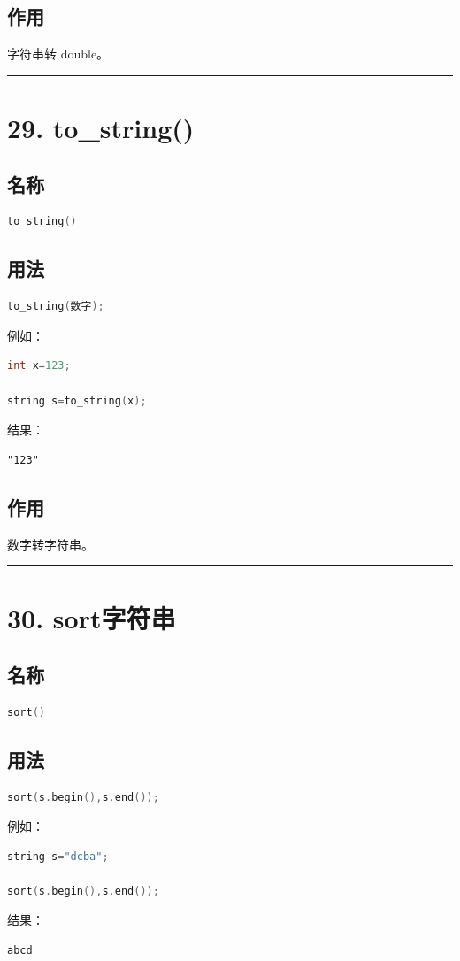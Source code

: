\documentclass[10pt,twocolumn]{extarticle}
\begin{document}
\subsection{作用}
字符串转 double。

\noindent\rule{\linewidth}{0.4pt}

\section{29. to\_string()}

\subsection{名称}
\begin{lstlisting}[language=C++]
to_string()
\end{lstlisting}

\subsection{用法}
\begin{lstlisting}[language=C++]
to_string(数字);
\end{lstlisting}
例如：
\begin{lstlisting}[language=C++]
int x=123;

string s=to_string(x);
\end{lstlisting}
结果：
\begin{lstlisting}
"123"
\end{lstlisting}

\subsection{作用}
数字转字符串。

\noindent\rule{\linewidth}{0.4pt}

\section{30. sort字符串}

\subsection{名称}
\begin{lstlisting}[language=C++]
sort()
\end{lstlisting}

\subsection{用法}
\begin{lstlisting}[language=C++]
sort(s.begin(),s.end());
\end{lstlisting}
例如：
\begin{lstlisting}[language=C++]
string s="dcba";

sort(s.begin(),s.end());
\end{lstlisting}
结果：
\begin{lstlisting}
abcd
\end{lstlisting}
\end{document}

